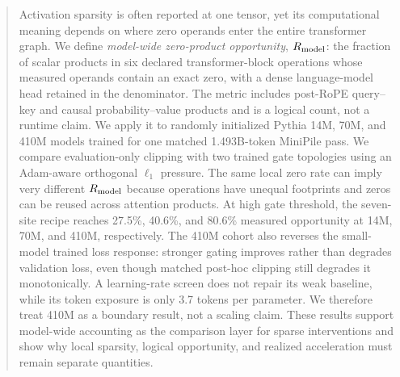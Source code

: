 \begin{abstract}
Activation sparsity is often reported at one tensor, yet its computational
meaning depends on where zero operands enter the entire transformer graph.  We
define \emph{model-wide zero-product opportunity}, $\Rmodel$: the fraction of
scalar products in six declared transformer-block operations whose measured
operands contain an exact zero, with a dense language-model head retained in
the denominator.  The metric includes post-RoPE query--key and causal
probability--value products and is a logical count, not a runtime claim.  We
apply it to randomly initialized Pythia 14M, 70M, and 410M models trained for
one matched 1.493B-token MiniPile pass.  We compare evaluation-only clipping
with two trained gate topologies using an Adam-aware orthogonal $\ell_1$
pressure.  The same local zero rate can imply very different $\Rmodel$ because
operations have unequal footprints and zeros can be reused across attention
products.  At high gate threshold, the seven-site recipe reaches 27.5\%,
40.6\%, and 80.6\% measured opportunity at 14M, 70M, and 410M, respectively.
The 410M cohort also reverses the small-model trained loss response: stronger
gating improves rather than degrades validation loss, even though matched
post-hoc clipping still degrades it monotonically.  A learning-rate screen
does not repair its weak baseline, while its token exposure is only 3.7
tokens per parameter.  We therefore treat 410M as a boundary result, not a
scaling claim.  These results support model-wide accounting as the comparison
layer for sparse interventions and show why local sparsity, logical
opportunity, and realized acceleration must remain separate quantities.
\end{abstract}
